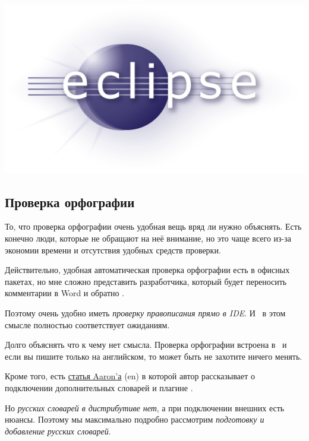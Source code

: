\chapter{\eclipse}\label{eclipse}

\includegraphics[height=0.5\textheight]{logo/eclipse.png}

\section{Проверка орфографии}


То, что проверка орфографии очень удобная вещь вряд ли нужно объяснять. Есть
конечно люди, которые не обращают на неё внимание, но это чаще всего из-за
экономии времени и отсутствия удобных средств проверки.

Действительно, удобная автоматическая проверка орфографии есть в офисных
пакетах, но мне сложно представить разработчика, который будет переносить
комментарии в Word и обратно \smiley.

Поэтому очень удобно иметь \emph{проверку правописания прямо в IDE}. И \eclipse\
в этом смысле полностью соответствует ожиданиям.

Долго объяснять что к чему нет смысла. Проверка орфографии встроена в \eclipse\
и если вы пишите только на английском, то может быть не захотите ничего менять.

Кроме того, есть
\href{http://www.102degrees.com/blog/2007/07/09/spell-checking-in-eclipse-pdt/}{статья
Aaron'а} (en) в которой автор рассказывает о подключении дополнительных словарей
и плагине \file{eSpell}.

Но \emph{русских словарей в дистрибутиве нет}, а при подключении внешних есть
нюансы. Поэтому мы максимально подробно рассмотрим \emph{подготовку и добавление
русских словарей}.

